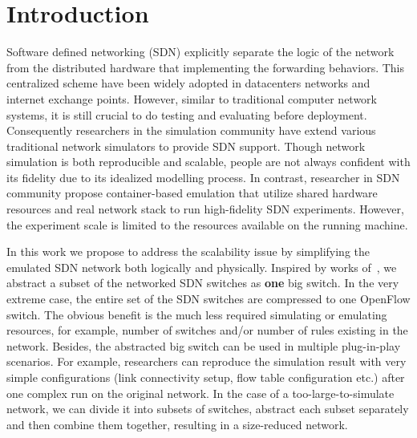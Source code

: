 \section{Introduction}

Software defined networking (SDN) explicitly separate the logic of the network
from the distributed hardware that implementing the forwarding behaviors.
This centralized scheme have been widely adopted in datacenters networks
and internet exchange points\cite{B4, Meridian, SDX}.
However, similar to traditional computer network systems, it is still crucial to do testing
and evaluating before deployment.
Consequently researchers in the simulation community have extend various
traditional network simulators to provide SDN support\cite{S3F, NS3, OPNET}.
Though network simulation is both reproducible and scalable,
people are not always confident with its fidelity due to its idealized modelling process.
In contrast, researcher in SDN community propose container-based emulation that utilize
shared hardware resources and real network stack to run high-fidelity SDN experiments\cite{Mininet}.
However, the experiment scale is limited to the resources available on the running machine.

In this work we propose to address the scalability issue by simplifying the emulated
SDN network both logically and physically.
Inspired by works of~\cite{OneBigSwitchAbstraction, Veriflow},
we abstract a subset of the networked SDN switches as \textbf{one} big switch.
In the very extreme case, the entire set of the SDN switches are compressed to
one OpenFlow switch.
The obvious benefit is the much less required simulating or emulating resources,
for example, number of switches and/or number of rules existing in the network.
Besides, the abstracted big switch can be used in multiple plug-in-play scenarios.
For example, researchers can reproduce the simulation result with very
simple configurations (link connectivity setup, flow table configuration etc.)
after one complex run on the original network.
In the case of a too-large-to-simulate network, we can divide it into subsets of switches,
abstract each subset separately and then combine them together, resulting in a
size-reduced network.

